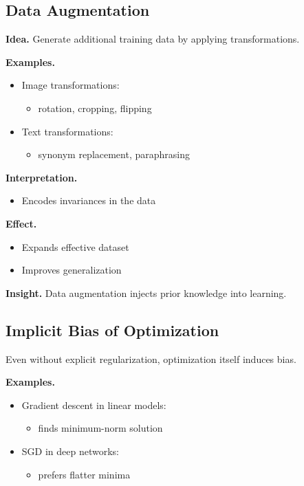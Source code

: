 \subsection{Data Augmentation}

\textbf{Idea.}  
Generate additional training data by applying transformations.

\medskip

\noindent
\textbf{Examples.}
\begin{itemize}
    \item Image transformations:
    \begin{itemize}
        \item rotation, cropping, flipping
    \end{itemize}

    \item Text transformations:
    \begin{itemize}
        \item synonym replacement, paraphrasing
    \end{itemize}
\end{itemize}

\medskip

\noindent
\textbf{Interpretation.}
\begin{itemize}
    \item Encodes invariances in the data
\end{itemize}

\medskip

\noindent
\textbf{Effect.}
\begin{itemize}
    \item Expands effective dataset
    \item Improves generalization
\end{itemize}

\medskip

\noindent
\textbf{Insight.}  
Data augmentation injects prior knowledge into learning.

\subsection{Implicit Bias of Optimization}

Even without explicit regularization, optimization itself induces bias.

\medskip

\noindent
\textbf{Examples.}

\begin{itemize}
    \item Gradient descent in linear models:
    \begin{itemize}
        \item finds minimum-norm solution
    \end{itemize}

    \item SGD in deep networks:
    \begin{itemize}
        \item prefers flatter minima
    \end{itemize}
\end{itemize}

